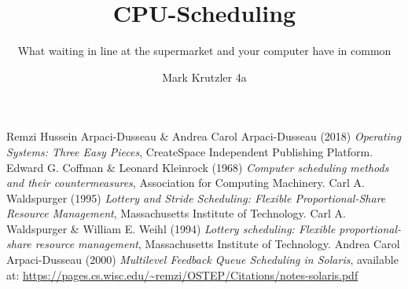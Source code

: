 \documentclass{mimosis}
\title{{CPU-Scheduling}}
\subtitle{What waiting in line at the supermarket and your computer have in common}
\author{Mark Krutzler 4a}
\begin{document}
          \frontmatter
          

          \tableofcontents
          \listoffigures


          \mainmatter


          

          

          \backmatter
          

          \begin{thebibliography}{99}
              Remzi Hussein Arpaci-Dusseau \& Andrea Carol Arpaci-Dusseau (2018) \emph{Operating Systems: Three Easy Pieces}, CreateSpace Independent Publishing Platform.
              Edward G. Coffman \& Leonard Kleinrock (1968) \emph{Computer scheduling methods and their countermeasures}, Association for Computing Machinery.
              Carl A. Waldspurger (1995) \emph{Lottery and Stride Scheduling: Flexible Proportional-Share Resource Management}, Massachusetts Institute of Technology.
              Carl A. Waldspurger \& William E. Weihl (1994) \emph{Lottery scheduling: Flexible proportional-share resource management}, Massachusetts Institute of Technology.
              Andrea Carol Arpaci-Dusseau (2000) \emph{Multilevel Feedback Queue Scheduling in Solaris}, available at: \url{https://pages.cs.wisc.edu/~remzi/OSTEP/Citations/notes-solaris.pdf}
          \end{thebibliography}
\end{document}
